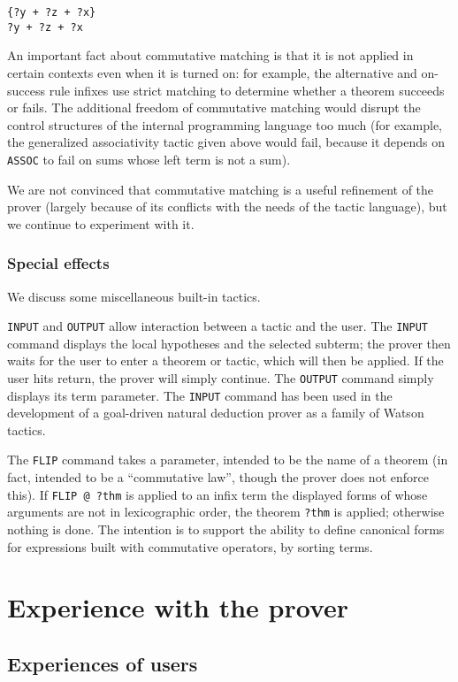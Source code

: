 \documentclass{kluwer}
\begin{document}
\begin{article}
\begin{verbatim}
{?y + ?z + ?x}
?y + ?z + ?x
\end{verbatim}

An important fact about commutative matching is that it is not applied
in certain contexts even when it is turned on: for example, the
alternative and on-success rule infixes use strict matching to
determine whether a theorem succeeds or fails.  The additional freedom
of commutative matching would disrupt the control structures of the
internal programming language too much (for example, the generalized
associativity tactic given above would fail, because it depends on
{\tt ASSOC} to fail on sums whose left term is not a sum).

We are not convinced that commutative matching is a useful refinement
of the prover (largely because of its conflicts with the needs of the
tactic language), but we continue to experiment with it.

\subsubsection{Special effects}

We discuss some miscellaneous built-in tactics.

{\tt INPUT} and {\tt OUTPUT} allow interaction between a tactic and
the user.  The {\tt INPUT} command displays the local hypotheses and
the selected subterm; the prover then waits for the user to enter a
theorem or tactic, which will then be applied.  If the user hits
return, the prover will simply continue.  The {\tt OUTPUT} command
simply displays its term parameter.  The {\tt INPUT} command has been
used in the development of a goal-driven natural deduction prover as a
family of Watson tactics.

The {\tt FLIP} command takes a parameter, intended to be the name of a
theorem (in fact, intended to be a ``commutative law'', though the
prover does not enforce this).  If {\tt FLIP @ ?thm} is applied to an
infix term the displayed forms of whose arguments are not in
lexicographic order, the theorem {\tt ?thm} is applied; otherwise
nothing is done.  The intention is to support the ability to define
canonical forms for expressions built with commutative operators, by
sorting terms.

\section{Experience with the prover}

\subsection{Experiences of users}


\end{article}
\end{document}
